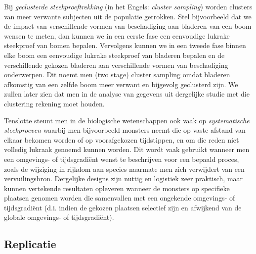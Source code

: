 \documentclass[
  dutch,
  letterpaper,
  12pt]{book}
\theoremstyle{definition}
\theoremstyle{definition}
\theoremstyle{definition}
\theoremstyle{remark}
\begin{document}
Bij \emph{geclusterde steekproeftrekking} (in het Engels: \emph{cluster
sampling}) worden clusters van meer verwante subjecten uit de populatie
getrokken. Stel bijvoorbeeld dat we de impact van verschillende vormen
van beschadiging aan bladeren van een boom wensen te meten, dan kunnen
we in een eerste fase een eenvoudige lukrake steekproef van bomen
bepalen. Vervolgens kunnen we in een tweede fase binnen elke boom een
eenvoudige lukrake steekproef van bladeren bepalen en de verschillende
gekozen bladeren aan verschillende vormen van beschadiging onderwerpen.
Dit noemt men (two stage) cluster sampling omdat bladeren afkomstig van
een zelfde boom meer verwant en bijgevolg geclusterd zijn. We zullen
later zien dat men in de analyse van gegevens uit dergelijke studie met
die clustering rekening moet houden.

Tenslotte steunt men in de biologische wetenschappen ook vaak op
\emph{systematische steekproeven} waarbij men bijvoorbeeld monsters
neemt die op vaste afstand van elkaar bekomen worden of op voorafgekozen
tijdstippen, en om die reden niet volledig lukraak genoemd kunnen
worden. Dit wordt vaak gebruikt wanneer men een omgevings- of
tijdsgradiënt wenst te beschrijven voor een bepaald proces, zoals de
wijziging in rijkdom aan species naarmate men zich verwijdert van een
vervuilingsbron. Dergelijke designs zijn nuttig en logistiek zeer
praktisch, maar kunnen vertekende resultaten opleveren wanneer de
monsters op specifieke plaatsen genomen worden die samenvallen met een
ongekende omgevings- of tijdsgradiënt (d.i. indien de gekozen plaatsen
selectief zijn en afwijkend van de globale omgevings- of tijdsgradiënt).

\subsection{Replicatie}\label{replicatie}
\end{document}
